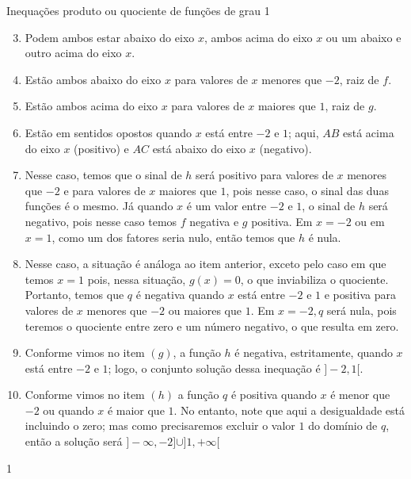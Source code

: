 \begin{answer}{Inequações produto ou quociente de funções de grau 1}
{\begin{enumerate}\setcounter{enumi}{2}
\item Podem ambos estar abaixo do eixo $x$, ambos acima do eixo $x$ ou um abaixo e outro acima do eixo $x$.
\item Estão ambos abaixo do eixo $x$ para valores de $x$ menores que $-2$, raiz de $f$.
\item Estão ambos acima do eixo $x$ para valores de $x$ maiores que $1$, raiz de $g$.
\item Estão em sentidos opostos quando $x$ está entre $-2$ e $1$; aqui, $AB$ está acima do eixo $x$ (positivo) e $AC$ está abaixo do eixo $x$ (negativo).
\item Nesse caso, temos que o sinal de $h$ será positivo para valores de $x$ menores que $-2$ e para valores de $x$ maiores que $1$, pois nesse caso, o sinal das duas funções é o mesmo. Já quando $x$ é um valor entre $-2$ e $1$, o sinal de $h$ será negativo, pois nesse caso temos $f$ negativa e $g$ positiva. Em $x = -2$ ou em $x = 1$, como um dos fatores seria nulo, então temos que $h$ é nula.
\item Nesse caso, a situação é análoga ao item anterior, exceto pelo caso em que temos $x=1$ pois, nessa situação, $g(x)=0$, o que inviabiliza o quociente. Portanto, temos que $q$ é negativa quando $x$ está entre $-2$ e $1$ e positiva para valores de $x$ menores que $-2$ ou maiores que $1$. Em $x=-2, q$ será nula, pois teremos o quociente entre zero e um número negativo, o que resulta em zero.
\item Conforme vimos no item $(g)$, a função $h$ é negativa, estritamente, quando $x$ está entre $-2$ e $1$; logo, o conjunto solução dessa inequação é $]-2,1[$.
\item  Conforme vimos no item $(h)$ a função $q$ é positiva quando $x$ é menor que $-2$ ou quando $x$ é maior que $1$. No entanto, note que aqui a desigualdade está incluindo o zero; mas como precisaremos excluir o valor $1$ do domínio de $q$, então a solução será $]-\infty, -2]\cup ]1,+\infty[$
\end{enumerate}
}{1}
\end{answer}




